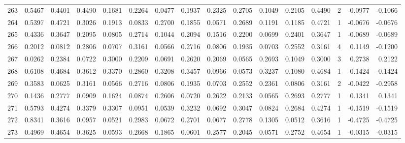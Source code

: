 \begin{tabular}{lrrrrrrrrrrrrrrr}
263 &      0.5467 &  0.4401 &  0.4490 &  0.1681 &  0.2264 &  0.0477 &  0.1937 &  0.2325 &  0.2705 &  0.1049 &   0.2105 &     0.4490 &      2 &                   -0.0977 &                    -0.1066 \\
264 &      0.5397 &  0.4721 &  0.3026 &  0.1913 &  0.0833 &  0.2700 &  0.1855 &  0.0571 &  0.2689 &  0.1191 &   0.1185 &     0.4721 &      1 &                   -0.0676 &                    -0.0676 \\
265 &      0.4336 &  0.3647 &  0.2095 &  0.0805 &  0.2714 &  0.1044 &  0.2094 &  0.1516 &  0.2200 &  0.0699 &   0.2401 &     0.3647 &      1 &                   -0.0689 &                    -0.0689 \\
266 &      0.2012 &  0.0812 &  0.2806 &  0.0707 &  0.3161 &  0.0566 &  0.2716 &  0.0806 &  0.1935 &  0.0703 &   0.2552 &     0.3161 &      4 &                    0.1149 &                    -0.1200 \\
267 &      0.0262 &  0.2384 &  0.0722 &  0.3000 &  0.2209 &  0.0691 &  0.2620 &  0.2069 &  0.0565 &  0.2693 &   0.1049 &     0.3000 &      3 &                    0.2738 &                     0.2122 \\
268 &      0.6108 &  0.4684 &  0.3612 &  0.3370 &  0.2860 &  0.3208 &  0.3457 &  0.0966 &  0.0573 &  0.3237 &   0.1080 &     0.4684 &      1 &                   -0.1424 &                    -0.1424 \\
269 &      0.3583 &  0.0625 &  0.3161 &  0.0566 &  0.2716 &  0.0806 &  0.1935 &  0.0703 &  0.2552 &  0.2361 &   0.0806 &     0.3161 &      2 &                   -0.0422 &                    -0.2958 \\
270 &      0.1436 &  0.2777 &  0.0909 &  0.1624 &  0.0874 &  0.2606 &  0.0720 &  0.2622 &  0.2133 &  0.0565 &   0.2693 &     0.2777 &      1 &                    0.1341 &                     0.1341 \\
271 &      0.5793 &  0.4274 &  0.3379 &  0.3307 &  0.0951 &  0.0539 &  0.3232 &  0.0692 &  0.3047 &  0.0824 &   0.2684 &     0.4274 &      1 &                   -0.1519 &                    -0.1519 \\
272 &      0.8341 &  0.3616 &  0.0957 &  0.0521 &  0.2983 &  0.0672 &  0.2701 &  0.0677 &  0.2778 &  0.1305 &   0.0512 &     0.3616 &      1 &                   -0.4725 &                    -0.4725 \\
273 &      0.4969 &  0.4654 &  0.3625 &  0.0593 &  0.2668 &  0.1865 &  0.0601 &  0.2577 &  0.2045 &  0.0571 &   0.2752 &     0.4654 &      1 &                   -0.0315 &                    -0.0315 \\

\end{tabular}
